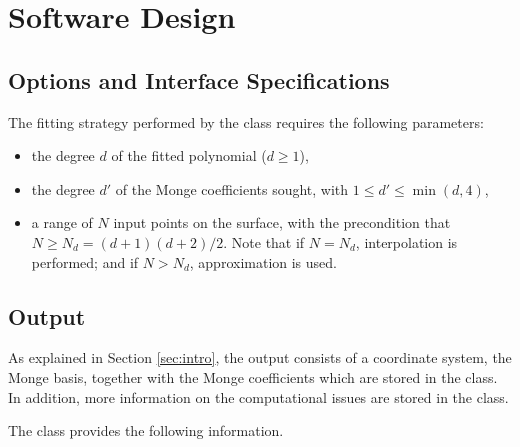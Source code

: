 \section{Software Design}

\subsection{Options and Interface Specifications}

The fitting strategy performed by the class
 requires the following parameters:
\begin{itemize}
\item
the degree $d$ of the fitted polynomial ($d \geq 1$),
\item
the degree $d'$ of the Monge coefficients sought, with $1 \leq d' \leq
\min(d,4) $,
\item
a range of $N$ input points on the surface, with the precondition that
$N \geq N_d = (d+1)(d+2)/2$. Note that if $N=N_d$, interpolation
is performed; and if $N >N_d$, approximation is used.
\end{itemize}

\subsection{Output}

As explained in Section \ref{sec:intro}, the output consists of a
coordinate system, the Monge basis, together with the Monge
coefficients which are stored in the  class. In
addition, more information on the computational issues are stored in
the  class.

The  class provides the following information.

